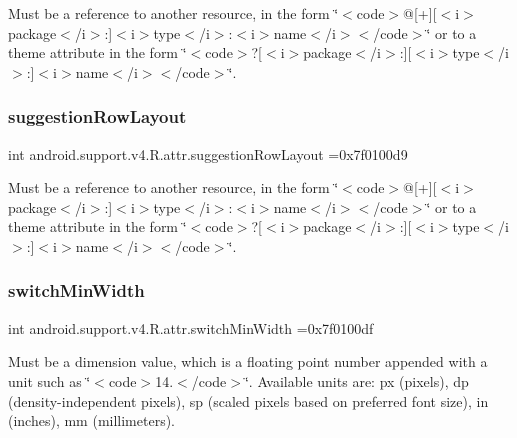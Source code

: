 Must be a reference to another resource, in the form \char`\"{}$<$code$>$@\mbox{[}+\mbox{]}\mbox{[}$<$i$>$package$<$/i$>$\+:\mbox{]}$<$i$>$type$<$/i$>$\+:$<$i$>$name$<$/i$>$$<$/code$>$\char`\"{} or to a theme attribute in the form \char`\"{}$<$code$>$?\mbox{[}$<$i$>$package$<$/i$>$\+:\mbox{]}\mbox{[}$<$i$>$type$<$/i$>$\+:\mbox{]}$<$i$>$name$<$/i$>$$<$/code$>$\char`\"{}. \mbox{\label{classandroid_1_1support_1_1v4_1_1R_1_1attr_a665c196172c2b516ee034b8ef773a9a0}} 
\subsubsection{\texorpdfstring{suggestion\+Row\+Layout}{suggestionRowLayout}}
{\footnotesize\ttfamily int android.\+support.\+v4.\+R.\+attr.\+suggestion\+Row\+Layout =0x7f0100d9\hspace{0.3cm}{\ttfamily [static]}}

Must be a reference to another resource, in the form \char`\"{}$<$code$>$@\mbox{[}+\mbox{]}\mbox{[}$<$i$>$package$<$/i$>$\+:\mbox{]}$<$i$>$type$<$/i$>$\+:$<$i$>$name$<$/i$>$$<$/code$>$\char`\"{} or to a theme attribute in the form \char`\"{}$<$code$>$?\mbox{[}$<$i$>$package$<$/i$>$\+:\mbox{]}\mbox{[}$<$i$>$type$<$/i$>$\+:\mbox{]}$<$i$>$name$<$/i$>$$<$/code$>$\char`\"{}. \mbox{\label{classandroid_1_1support_1_1v4_1_1R_1_1attr_a7c019492c8733534606bb32dc3cc6df5}} 
\subsubsection{\texorpdfstring{switch\+Min\+Width}{switchMinWidth}}
{\footnotesize\ttfamily int android.\+support.\+v4.\+R.\+attr.\+switch\+Min\+Width =0x7f0100df\hspace{0.3cm}{\ttfamily [static]}}

Must be a dimension value, which is a floating point number appended with a unit such as \char`\"{}$<$code$>$14.\+5sp$<$/code$>$\char`\"{}. Available units are\+: px (pixels), dp (density-\/independent pixels), sp (scaled pixels based on preferred font size), in (inches), mm (millimeters). 

